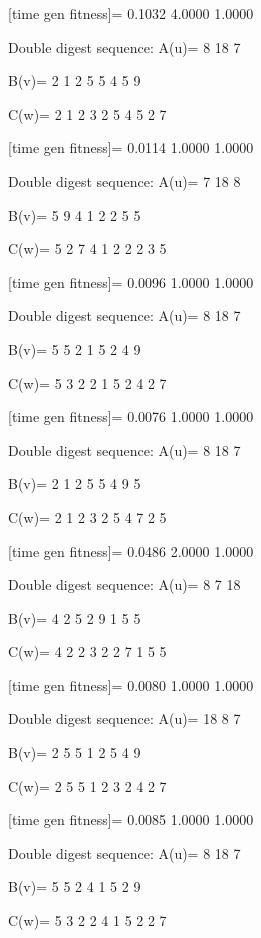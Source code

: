 [time gen fitness]=
    0.1032    4.0000    1.0000

Double digest sequence:
A(u)=
     8    18     7

B(v)=
     2     1     2     5     5     4     5     9

C(w)=
     2     1     2     3     2     5     4     5     2     7

[time gen fitness]=
    0.0114    1.0000    1.0000

Double digest sequence:
A(u)=
     7    18     8

B(v)=
     5     9     4     1     2     2     5     5

C(w)=
     5     2     7     4     1     2     2     2     3     5

[time gen fitness]=
    0.0096    1.0000    1.0000

Double digest sequence:
A(u)=
     8    18     7

B(v)=
     5     5     2     1     5     2     4     9

C(w)=
     5     3     2     2     1     5     2     4     2     7

[time gen fitness]=
    0.0076    1.0000    1.0000

Double digest sequence:
A(u)=
     8    18     7

B(v)=
     2     1     2     5     5     4     9     5

C(w)=
     2     1     2     3     2     5     4     7     2     5

[time gen fitness]=
    0.0486    2.0000    1.0000

Double digest sequence:
A(u)=
     8     7    18

B(v)=
     4     2     5     2     9     1     5     5

C(w)=
     4     2     2     3     2     2     7     1     5     5

[time gen fitness]=
    0.0080    1.0000    1.0000

Double digest sequence:
A(u)=
    18     8     7

B(v)=
     2     5     5     1     2     5     4     9

C(w)=
     2     5     5     1     2     3     2     4     2     7

[time gen fitness]=
    0.0085    1.0000    1.0000

Double digest sequence:
A(u)=
     8    18     7

B(v)=
     5     5     2     4     1     5     2     9

C(w)=
     5     3     2     2     4     1     5     2     2     7

